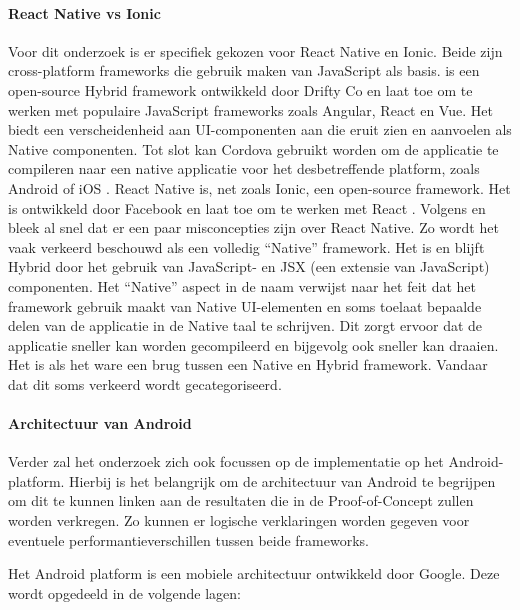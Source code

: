 \paragraph{React Native vs Ionic}
Voor dit onderzoek is er specifiek gekozen voor React Native en Ionic. Beide zijn cross-platform frameworks die gebruik maken van JavaScript als basis. \textcite{Bron8} is een open-source Hybrid framework ontwikkeld door Drifty Co en laat toe om te werken met populaire JavaScript frameworks zoals Angular, React en Vue. Het biedt een verscheidenheid aan UI-componenten aan die eruit zien en aanvoelen als Native componenten. Tot slot kan Cordova gebruikt worden om de applicatie te compileren naar een native applicatie voor het desbetreffende platform, zoals Android of iOS \autocite{Bron8}.
React Native is, net zoals Ionic, een open-source framework. Het is ontwikkeld door Facebook en laat toe om te werken met React \autocite{Bron1}. Volgens \textcite{Bron3} en \textcite{Bron2} bleek al snel dat er een paar misconcepties zijn over React Native. Zo wordt het vaak verkeerd beschouwd als een volledig ``Native'' framework. Het is en blijft Hybrid door het gebruik van JavaScript- en JSX (een extensie van JavaScript) componenten. Het ``Native'' aspect in de naam verwijst naar het feit dat het framework gebruik maakt van Native UI-elementen en soms toelaat bepaalde delen van de applicatie in de Native taal te schrijven. Dit zorgt ervoor dat de applicatie sneller kan worden gecompileerd en bijgevolg ook sneller kan draaien. Het is als het ware een brug tussen een Native en Hybrid framework. Vandaar dat dit soms verkeerd wordt gecategoriseerd.

\paragraph{Architectuur van Android}

Verder zal het onderzoek zich ook focussen op de implementatie op het Android-platform. Hierbij is het belangrijk om de architectuur van Android te begrijpen om dit te kunnen linken aan de resultaten die in de Proof-of-Concept zullen worden verkregen. Zo kunnen er logische verklaringen worden gegeven voor eventuele performantieverschillen tussen beide frameworks.

Het Android platform is een mobiele architectuur ontwikkeld door Google. Deze wordt opgedeeld in de volgende lagen:

